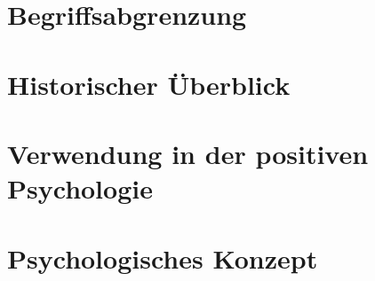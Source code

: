\section{Begriffsabgrenzung}\label{abgrenzung}

\section{Historischer Überblick}\label{überblick}

\section{Verwendung in der positiven Psychologie}\label{positivePsychologie}

\section{Psychologisches Konzept}\label{konzept}


